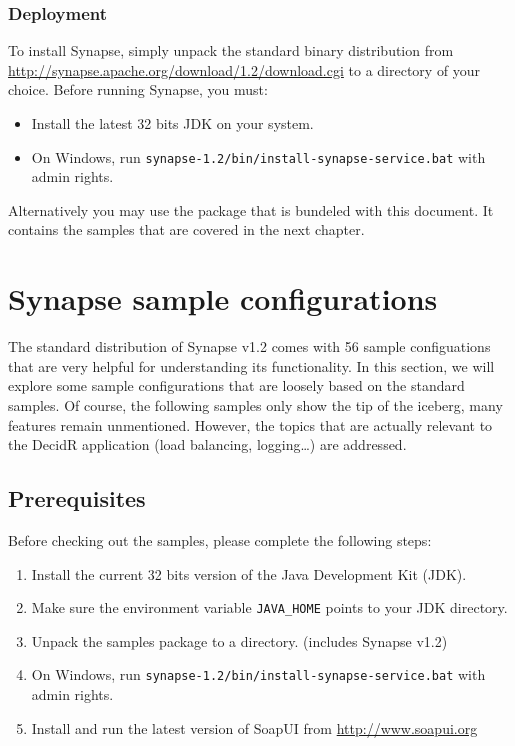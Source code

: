 \subsubsection{Deployment}
\label{subsec:deployment}

To install Synapse, simply unpack the standard binary distribution from
\url{http://synapse.apache.org/download/1.2/download.cgi} to a directory of
your choice. Before running Synapse, you must:
\begin{itemize}
  \item Install the latest 32 bits JDK on your system.
  \item On Windows, run \texttt{synapse-1.2/bin/install-synapse-service.bat} with
admin rights.
\end{itemize}

Alternatively you may use the package that is bundeled with this document. It
contains the samples that are covered in the next chapter.

\section{Synapse sample configurations}
\label{chap:Synpase-sample-configurations}
\lstset{frame=single,
	    basicstyle=\tiny,
	    numbers=left,                   
		numberstyle=\tiny, 
	    commentstyle=\textit,
	    breaklines=true}

The standard distribution of Synapse v1.2 comes with 56 sample configuations that
are very helpful for understanding its functionality. In this section, we will
explore some sample configurations that are loosely based on the standard
samples. Of course, the following samples only show the tip of the iceberg, many
features remain unmentioned. However, the topics that are actually relevant to
the DecidR application (load balancing, logging\ldots) are addressed.

\subsection{Prerequisites}
\label{sec:prerequisites}

Before checking out the samples, please complete the following steps: 

\begin{enumerate}
\item Install the current 32 bits version of the Java Development Kit (JDK).
\item Make sure the environment variable \texttt{JAVA\_HOME} points to your JDK
directory.
\item Unpack the samples package to a directory. (includes Synapse
v1.2)
\item On Windows, run \texttt{synapse-1.2/bin/install-synapse-service.bat} with
admin rights.
\item Install and run the latest version of SoapUI from
\url{http://www.soapui.org}
\end{enumerate}

